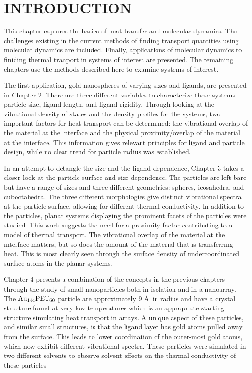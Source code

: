 \chapter{INTRODUCTION}\label{chap:intro}
This chapter explores the basics of heat transfer and molecular dynamics. The challenges existing in the current methods of finding transport quantities using molecular dynamics are included. Finally, applications of molecular dynamics to finiding thermal tranport in systems of interest are presented. The remaining chapters use the methods described here to examine systems of interest.

The first application, gold nanospheres of varying sizes and ligands, are presented in Chapter 2.  There are three different variables to characterize these systems: particle size, ligand length, and ligand rigidity. Through looking at the vibrational density of states and the density profiles for the systems, two important factors for heat transport can be determined: the vibrational overlap of the material at the interface and the physical proximity/overlap of the material at the interface. This information gives relevant principles for ligand and particle design, while no clear trend for particle radius was established. 

In an attempt to detangle the size and the ligand dependence, Chapter 3 takes a closer look at the particle surface and size dependence. 
The particles are left bare but have a range of sizes and three different geometries: spheres, icosahedra, and cuboctahedra.
The three different morphologies give  distinct vibrational spectra at the particle surface, allowing for different thermal conductivity. In addition to the particles, planar systems displaying the prominent facets of the particles were studied. This work suggests the need for a proximity factor contributing to a model of thermal transport.
The vibrational overlap of the material at the interface matters, but so does the amount of the material that is transferring heat. This is most clearly seen through the surface density of undercoordinated surface atoms in the planar systems.

Chapter 4 presents a combination of the concepts in the previous chapters through the study of small nanoparticles both in isolation and in a nanoarray. The $\ce{Au}_{144}\ce{PET}_{60}$ particle are approximately 9 \AA\ in radius and have a crystal structure found at very low temperatures which is an appropriate starting structure simulating heat transport in arrays. A unique aspect of these particles, and similar small structures, is that the ligand layer has gold atoms pulled away from the surface. This leads to lower coordination of the outer-most gold atoms, which now exhibit different vibrational spectra. These particles were simulated in two different solvents to observe solvent effects on the thermal conductivity of these particles.

